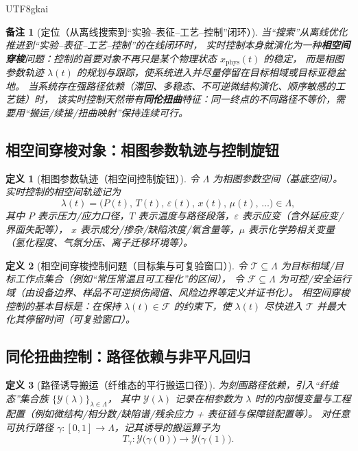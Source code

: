 \documentclass[12pt]{article}
\newtheorem{definition}{定义}[section]
\newtheorem{remark}{备注}[section]
\begin{document}
\begin{CJK*}{UTF8}{gkai}
\begin{remark}[定位（从离线搜索到“实验--表征--工艺--控制”闭环）]
当“搜索”从离线优化推进到“实验--表征--工艺--控制”的在线闭环时，
实时控制本身就演化为一种\textbf{相空间穿梭}问题：控制的首要对象不再只是某个物理状态 $x_{\mathrm{phys}}(t)$ 的稳定，
而是相图参数轨迹 $\lambda(t)$ 的规划与跟踪，使系统进入并尽量停留在目标相域或目标亚稳盆地。
当系统存在强路径依赖（滞回、多稳态、不可逆微结构演化、顺序敏感的工艺链）时，
该实时控制天然带有\textbf{同伦扭曲}特征：同一终点的不同路径不等价，需要用“搬运/续接/扭曲映射”保持连续可行。
\end{remark}

\subsection{相空间穿梭对象：相图参数轨迹与控制旋钮}
\label{sec:phase-space-shuttling-object}

\begin{definition}[相图参数轨迹（相空间控制旋钮）]
令 $\Lambda$ 为相图参数空间（基底空间）。实时控制的相空间轨迹记为
\[
  \lambda(t)=\bigl(P(t),\,T(t),\,\varepsilon(t),\,x(t),\,\mu(t),\,\dots\bigr)\in\Lambda,
\]
其中 $P$ 表示压力/应力口径，$T$ 表示温度与路径段落，$\varepsilon$ 表示应变（含外延应变/界面失配等），
$x$ 表示成分/掺杂/缺陷浓度/氧含量等，$\mu$ 表示化学势相关变量（氢化程度、气氛分压、离子迁移环境等）。
\end{definition}

\begin{definition}[相空间穿梭控制问题（目标集与可复验窗口）]
令 $\mathcal{T}\subseteq\Lambda$ 为目标相域/目标工作点集合（例如“常压常温且可工程化”的区间），
令 $\mathcal{F}\subseteq\Lambda$ 为可控/安全运行域（由设备边界、样品不可逆损伤阈值、风险边界等定义并证书化）。
相空间穿梭控制的基本目标是：在保持 $\lambda(t)\in\mathcal{F}$ 的约束下，使 $\lambda(t)$ 尽快进入 $\mathcal{T}$ 并最大化其停留时间（可复验窗口）。
\end{definition}

\subsection{同伦扭曲控制：路径依赖与非平凡回归}
\label{sec:twisted-homotopy-control}

\begin{definition}[路径诱导搬运（纤维态的平行搬运口径）]
为刻画路径依赖，引入“纤维态”集合族 $\{\mathcal{Y}(\lambda)\}_{\lambda\in\Lambda}$，
其中 $\mathcal{Y}(\lambda)$ 记录在相参数为 $\lambda$ 时的内部慢变量与工程配置（例如微结构/相分数/缺陷谱/残余应力 + 表征链与保障链配置等）。
对任意可执行路径 $\gamma:[0,1]\to\Lambda$，记其诱导的搬运算子为
\[
  T_{\gamma}:\mathcal{Y}\bigl(\gamma(0)\bigr)\to \mathcal{Y}\bigl(\gamma(1)\bigr).
\]
\end{definition}


\end{CJK*}
\end{document}
